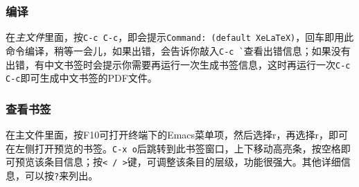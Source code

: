 \subsubsection{编译}
\label{sec:auctex-compile}
在\emph{主文件}里面，按\verb|C-c C-c|，即会提示\verb|Command: (default XeLaTeX)|，回车即用此命令编译，稍等一会儿，如果出错，会告诉你敲入\verb|C-c `|查看出错信息；如果没有出错，有中文书签时会提示你需要再运行一次生成书签信息，这时再运行一次\verb|C-c C-c|即可生成中文书签的PDF文件。
\subsubsection{查看书签}
\label{sec:auctex-view-toc}
在主文件里面，按F10可打开终端下的Emacs菜单项，然后选择r，再选择r，即可在左侧打开预览的书签。\verb|C-x o|后跳转到此书签窗口，上下移动高亮条，按空格即可预览该条目信息；按\verb|< / >|键，可调整该条目的层级，功能很强大。其他详细信息，可以按\verb|?|来列出。
